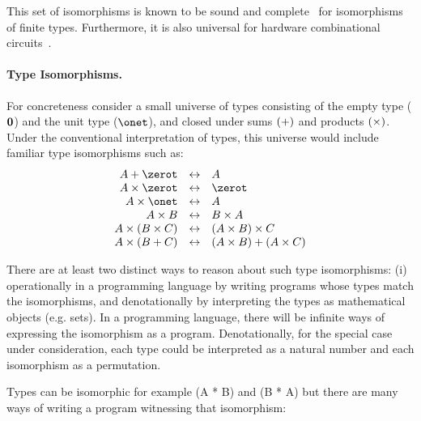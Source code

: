 
This set of isomorphisms is known to be sound and
complete~\cite{Fiore:2004,fiore-remarks} for isomorphisms
of finite types.  Furthermore, it is also universal
for hardware combinational
circuits~\cite{James:2012:IE:2103656.2103667}.



\paragraph*{Type Isomorphisms.} For concreteness consider a small universe of
types consisting of the empty type (${\mathbf{0}}$) and the unit type ($\onet$), and
closed under sums $(\mathbin{\mathsf{+}})$ and products $(\mathbin{\mathsf{\times}})$. Under the conventional
interpretation of types, this universe would include familiar type isomorphisms
such as:
\[\begin{array}{rcl}
    A \sumt \zerot &\isot& A \\
    A \prodt \zerot &\isot& \zerot \\
    A \prodt \onet &\isot& A \\
    A \prodt B &\isot& B \prodt A \\
    A \prodt (B \prodt C) &\isot& (A \prodt B) \prodt C \\
    A \prodt (B \sumt C) &\isot& (A \prodt B) \sumt (A \prodt C)
\end{array}\]

There are at least two distinct ways to reason about such type isomorphisms: (i)
operationally in a programming language by writing programs whose types match
the isomorphisms, and denotationally by interpreting the types as mathematical
objects (e.g. sets). In a programming language, there will be infinite ways of
expressing the isomorphism as a program. Denotationally, for the special case
under consideration, each type could be interpreted as a natural number and each
isomorphism as a permutation.




Types can be isomorphic for example (A * B) and (B * A) but
there are many ways of writing a program witnessing that isomorphism:

